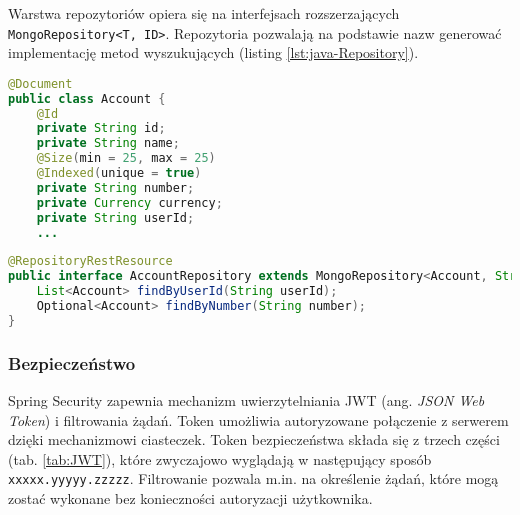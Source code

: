 Warstwa repozytoriów opiera się na interfejsach rozszerzających \texttt{MongoRepository<T, ID>}. Repozytoria pozwalają na podstawie nazw generować implementację metod wyszukujących (listing \ref{lst:java-Repository}).
\begin{lstlisting}[language={Java}, caption={Fragment modelu Account}, label={lst:java-Account}]
@Document
public class Account {
	@Id
	private String id;
	private String name;
	@Size(min = 25, max = 25)
	@Indexed(unique = true)
	private String number;
	private Currency currency;
	private String userId;
	...
\end{lstlisting}
\begin{lstlisting}[language={Java}, caption={Repozytorium dla klasy Account}, label={lst:java-Repository}]
@RepositoryRestResource
public interface AccountRepository extends MongoRepository<Account, String> {
	List<Account> findByUserId(String userId);
	Optional<Account> findByNumber(String number);
}
	\end{lstlisting}
\subsubsection*{Bezpieczeństwo}
Spring Security zapewnia mechanizm uwierzytelniania JWT (ang. \textit{JSON Web Token}) i filtrowania żądań. Token umożliwia autoryzowane połączenie z serwerem dzięki mechanizmowi ciasteczek. Token bezpieczeństwa składa się z trzech części (tab. \ref{tab:JWT}), które zwyczajowo wyglądają w następujący sposób \texttt{xxxxx.yyyyy.zzzzz}. Filtrowanie pozwala m.in. na określenie żądań, które mogą zostać wykonane bez konieczności autoryzacji użytkownika.

